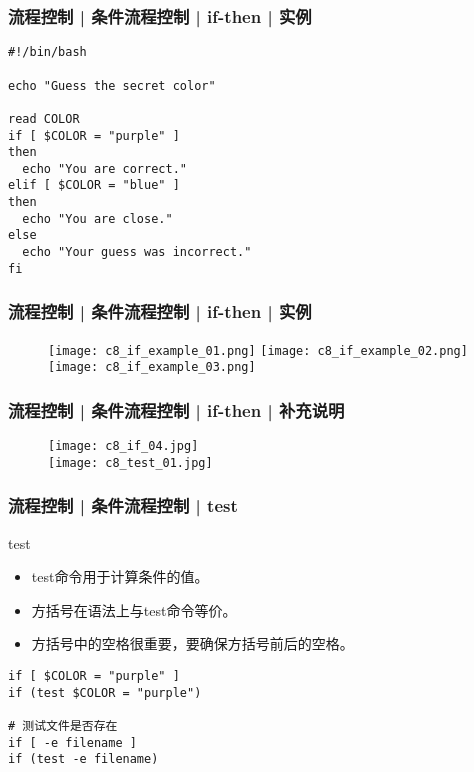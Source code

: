 \begin{frame}[fragile]
  \frametitle{流程控制 | 条件流程控制 | if-then | 实例}
\begin{lstlisting}
#!/bin/bash

echo "Guess the secret color"

read COLOR
if [ $COLOR = "purple" ]
then
  echo "You are correct."
elif [ $COLOR = "blue" ]
then
  echo "You are close."
else
  echo "Your guess was incorrect."
fi
\end{lstlisting}
\end{frame}

\begin{frame}
  \frametitle{流程控制 | 条件流程控制 | if-then | \alert{实例}}
  \begin{figure}
    \texttt{[image: c8\_if\_example\_01.png]}\quad
    \texttt{[image: c8\_if\_example\_02.png]}\\
    \texttt{[image: c8\_if\_example\_03.png]}
  \end{figure}
\end{frame}

\begin{frame}
  \frametitle{流程控制 | 条件流程控制 | if-then | 补充说明}
  \begin{figure}
    \centering
    \texttt{[image: c8\_if\_04.jpg]}\\
    \texttt{[image: c8\_test\_01.jpg]}
  \end{figure}
\end{frame}

\begin{frame}[fragile]
  \frametitle{流程控制 | 条件流程控制 | \alert{test}}
  \begin{block}{test}
    \begin{itemize}
      \item test命令用于计算条件的值。
      \item 方括号在语法上与test命令等价。
      \item 方括号中的空格很重要，要确保方括号前后的空格。
    \end{itemize}
  \end{block}
  \pause
\begin{lstlisting}
if [ $COLOR = "purple" ]
if (test $COLOR = "purple")

# 测试文件是否存在
if [ -e filename ]
if (test -e filename)
\end{lstlisting}
\end{frame}

